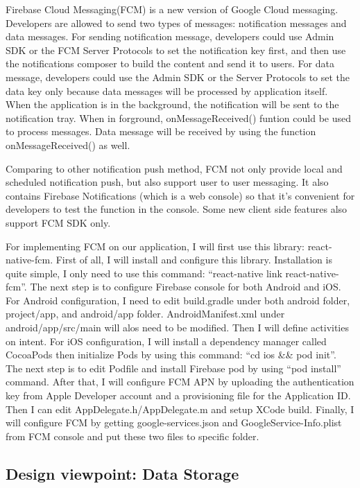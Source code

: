 \documentclass[letterpaper, 10pt,titlepage]{article}
\begin{document}
Firebase Cloud Messaging(FCM) is a new version of Google Cloud messaging. Developers are allowed to send two types of messages: notification messages and data messages. For sending notification message, developers could use Admin SDK or the FCM Server Protocols to set the notification key first, and then use the notifications composer to build the content and send it to users. For data message, developers could use the Admin SDK or the Server Protocols to set the data key only because data messages will be processed by application itself. When the application is in the background, the notification will be sent to the notification tray. When in forground, onMessageReceived() funtion could be used to process messages. Data message will be received by using the function onMessageReceived() as well.\cite{firebasecloudmessage}

Comparing to other notification push method, FCM not only provide local and scheduled notification push, but also support user to user messaging. It also contains Firebase Notifications (which is a web console) so that it's convenient for developers to test the function in the console. Some new client side features also support FCM SDK only.

For implementing FCM on our application, I will first use this library: react-native-fcm. First of all, I will install and configure this library. Installation is quite simple, I only need to use this command: ``react-native link react-native-fcm''. The next step is to configure Firebase console for both Android and iOS. For Android configuration, I need to edit build.gradle under both android folder, project/app, and android/app folder. AndroidManifest.xml under android/app/src/main will alos need to be modified. Then I will define activities on intent. For iOS configuration, I will install a dependency manager called CocoaPods then initialize Pods by using this command: ``cd ios \&\& pod init''. The next step is to edit Podfile and install Firebase pod by using ``pod install'' command. After that, I will configure FCM APN by uploading the authentication key from Apple Developer account and a provisioning file for the Application ID. Then I can edit AppDelegate.h/AppDelegate.m and setup XCode build. Finally, I will configure FCM by getting google-services.json and GoogleService-Info.plist from FCM console and put these two files to specific folder.

\subsection{Design viewpoint: Data Storage}
\end{document}
